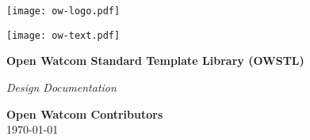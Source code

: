 \documentclass[11pt]{report}
\begin{document}
\begin{titlepage}
  \centering
  \vspace*{2cm}

  \texttt{[image: ow-logo.pdf]}

  \vspace{1cm}

  \texttt{[image: ow-text.pdf]}

  \vspace{2cm}

  {\Large\bfseries Open Watcom Standard Template Library (OWSTL)}

  \vspace{1cm}

  \textit{Design Documentation}

  \vfill

  \textbf{Open Watcom Contributors} \\
  \today
\end{titlepage}


\tableofcontents
\clearpage

\setcounter{page}{1}










\end{document}
